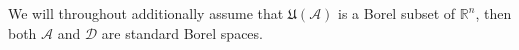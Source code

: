 \documentclass[a4paper,final]{article}
\newcommand\A{\mathcal{A}}
\newcommand\U{\mathfrak{U}} %
\newcommand{\Decs}{\mathcal{D}}
\renewcommand{\Re}{\mathbb{R}}
\renewcommand{\color}[1]{}
\newenvironment{colored}[1]{\leavevmode\color{#1}}{}
\newcommand\SetDelimiter[1][]{
	\nonscript\,#1\vert \allowbreak \nonscript\,\mathopen{}}
\providecommand\given{\SetDelimiter}
\renewcommand{\leq}{\leqslant}
\newenvironment{CCM rewritten}
{\begingroup\color{blue}} %
{\endgroup}              %
\begin{document}
\begin{colored}{violet}
	
	We will throughout additionally assume that $\U(\A)$ is a Borel subset of $\Re^n$, then both $\A$ and $\Decs$ are standard Borel spaces.%
	

\end{colored}
\end{document}
